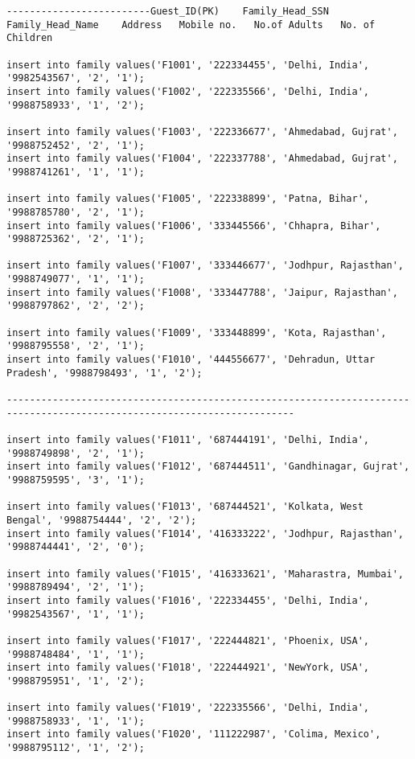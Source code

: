 \documentclass[a4,12pt]{report}
\begin{document}
\begin{lstlisting}
-------------------------Guest_ID(PK)    Family_Head_SSN    Family_Head_Name    Address   Mobile no.   No.of Adults   No. of Children

insert into family values('F1001', '222334455', 'Delhi, India', '9982543567', '2', '1');
insert into family values('F1002', '222335566', 'Delhi, India', '9988758933', '1', '2');

insert into family values('F1003', '222336677', 'Ahmedabad, Gujrat', '9988752452', '2', '1');
insert into family values('F1004', '222337788', 'Ahmedabad, Gujrat', '9988741261', '1', '1');

insert into family values('F1005', '222338899', 'Patna, Bihar', '9988785780', '2', '1');
insert into family values('F1006', '333445566', 'Chhapra, Bihar', '9988725362', '2', '1');

insert into family values('F1007', '333446677', 'Jodhpur, Rajasthan', '9988749077', '1', '1');
insert into family values('F1008', '333447788', 'Jaipur, Rajasthan', '9988797862', '2', '2');

insert into family values('F1009', '333448899', 'Kota, Rajasthan', '9988795558', '2', '1');
insert into family values('F1010', '444556677', 'Dehradun, Uttar Pradesh', '9988798493', '1', '2');

------------------------------------------------------------------------------------------------------------------------

insert into family values('F1011', '687444191', 'Delhi, India', '9988749898', '2', '1');
insert into family values('F1012', '687444511', 'Gandhinagar, Gujrat', '9988759595', '3', '1');

insert into family values('F1013', '687444521', 'Kolkata, West Bengal', '9988754444', '2', '2');
insert into family values('F1014', '416333222', 'Jodhpur, Rajasthan', '9988744441', '2', '0');

insert into family values('F1015', '416333621', 'Maharastra, Mumbai', '9988789494', '2', '1');
insert into family values('F1016', '222334455', 'Delhi, India', '9982543567', '1', '1');

insert into family values('F1017', '222444821', 'Phoenix, USA', '9988748484', '1', '1');
insert into family values('F1018', '222444921', 'NewYork, USA', '9988795951', '1', '2');

insert into family values('F1019', '222335566', 'Delhi, India', '9988758933', '1', '1');
insert into family values('F1020', '111222987', 'Colima, Mexico', '9988795112', '1', '2');


\end{lstlisting}
\end{document}
